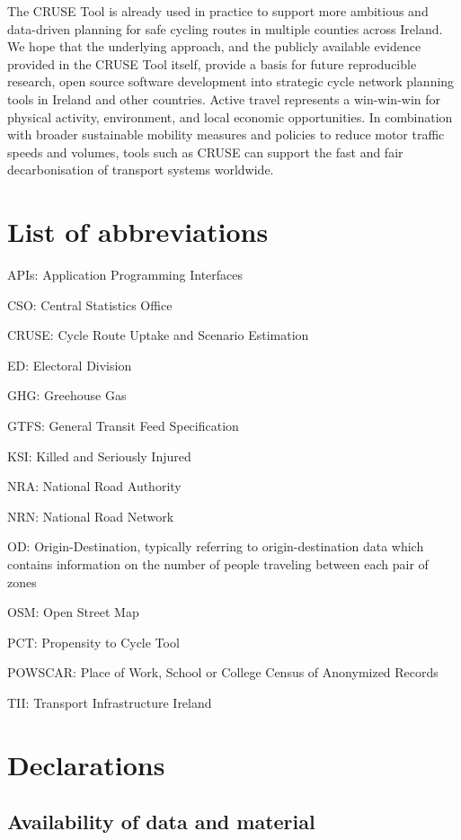 \documentclass[
  super,
  preprint,
  3p]{elsarticle}
\begin{document}
The CRUSE Tool is already used in practice to support more ambitious and
data-driven planning for safe cycling routes in multiple counties across
Ireland. We hope that the underlying approach, and the publicly
available evidence provided in the CRUSE Tool itself, provide a basis
for future reproducible research, open source software development into
strategic cycle network planning tools in Ireland and other countries.
Active travel represents a win-win-win for physical activity,
environment, and local economic opportunities. In combination with
broader sustainable mobility measures and policies to reduce motor
traffic speeds and volumes, tools such as CRUSE can support the fast and
fair decarbonisation of transport systems worldwide.

\hypertarget{list-of-abbreviations}{%
\section{List of abbreviations}\label{list-of-abbreviations}}

APIs: Application Programming Interfaces

CSO: Central Statistics Office

CRUSE: Cycle Route Uptake and Scenario Estimation

ED: Electoral Division

GHG: Greehouse Gas

GTFS: General Transit Feed Specification

KSI: Killed and Seriously Injured

NRA: National Road Authority

NRN: National Road Network

OD: Origin-Destination, typically referring to origin-destination data
which contains information on the number of people traveling between
each pair of zones

OSM: Open Street Map

PCT: Propensity to Cycle Tool

POWSCAR: Place of Work, School or College Census of Anonymized Records

TII: Transport Infrastructure Ireland

\hypertarget{declarations}{%
\section{Declarations}\label{declarations}}

\hypertarget{availability-of-data-and-material}{%
\subsection*{Availability of data and
material}\label{availability-of-data-and-material}}
\end{document}
